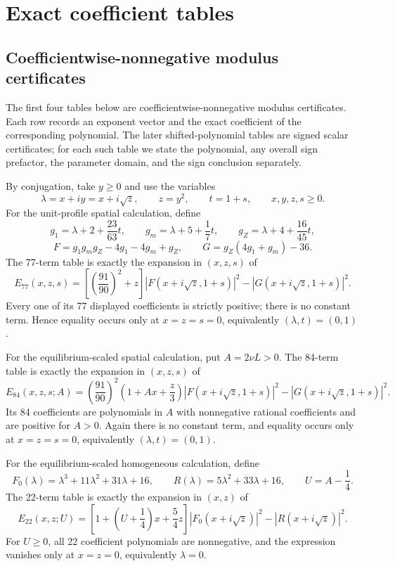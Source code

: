 \documentclass[10pt]{article}
\newcommand{\1}{\mathbf1}
\begin{document}
\section{Exact coefficient tables}\label{sec:coefftables}

\subsection{Coefficientwise-nonnegative modulus certificates}

The first four tables below are coefficientwise-nonnegative modulus
certificates.  Each row records an exponent vector and the exact coefficient
of the corresponding polynomial.  The later shifted-polynomial tables are
signed scalar certificates; for each such table we state the polynomial, any
overall sign prefactor, the parameter domain, and the sign conclusion
separately.

By conjugation, take $y\ge0$ and use the variables
\[
 \lambda=x+i y=x+i\sqrt z,\qquad z=y^2,\qquad t=1+s,
 \qquad x,y,z,s\ge0.
\]
For the unit-profile spatial calculation, define
\[
 g_1=\lambda+2+\frac{23}{63}t,\qquad
 g_m=\lambda+5+\frac17t,\qquad
 g_Z=\lambda+4+\frac{16}{45}t,
\]
\[
 F=g_1g_mg_Z-4g_1-4g_m+g_Z,
 \qquad G=g_Z(4g_1+g_m)-36.
\]
The 77-term table is exactly the expansion in $(x,z,s)$ of
\[
 E_{77}(x,z,s)=
 \left[\left(\frac{91}{90}\right)^2+z\right]
 \left|F(x+i\sqrt z,1+s)\right|^2
 -\left|G(x+i\sqrt z,1+s)\right|^2.
\]
Every one of its 77 displayed coefficients is strictly positive; there is no
constant term.  Hence equality occurs only at $x=z=s=0$, equivalently
$(\lambda,t)=(0,1)$.

For the equilibrium-scaled spatial calculation, put $A=2\nu L>0$.  The
84-term table is exactly the expansion in $(x,z,s)$ of
\[
 E_{84}(x,z,s;A)=
 \left(\frac{91}{90}\right)^2
 \left(1+Ax+\frac z3\right)
 \left|F(x+i\sqrt z,1+s)\right|^2
 -\left|G(x+i\sqrt z,1+s)\right|^2.
\]
Its 84 coefficients are polynomials in $A$ with nonnegative rational
coefficients and are positive for $A>0$.  Again there is no constant term,
and equality occurs only at $x=z=s=0$, equivalently
$(\lambda,t)=(0,1)$.

For the equilibrium-scaled homogeneous calculation, define
\[
 F_0(\lambda)=\lambda^3+11\lambda^2+31\lambda+16,
 \qquad R(\lambda)=5\lambda^2+33\lambda+16,
 \qquad U=A-\frac14.
\]
The 22-term table is exactly the expansion in $(x,z)$ of
\[
 E_{22}(x,z;U)=
 \left[1+\left(U+\frac14\right)x+\frac54z\right]
 |F_0(x+i\sqrt z)|^2-|R(x+i\sqrt z)|^2.
\]
For $U\ge0$, all 22 coefficient polynomials are nonnegative, and the
expression vanishes only at $x=z=0$, equivalently $\lambda=0$.
\end{document}
